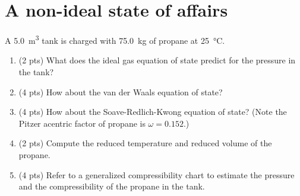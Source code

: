 \documentclass[11pt]{article}
\begin{document}
\section{A non-ideal state of affairs}
\label{sec-5}
A \SI{5.0}{\meter\cubed} tank is charged with \SI{75.0}{\kilo\gram} of propane at \SI{25}{\celsius}.

\begin{enumerate}
\item (2 pts) What does the ideal gas equation of state predict for the pressure in the tank?
\item (4 pts) How about the van der Waals equation of state?
\item (4 pts) How about the Soave-Redlich-Kwong equation of state?  (Note the Pitzer acentric factor of propane is \(\omega = 0.152\).)
\item (2 pts) Compute the reduced temperature and reduced volume of the propane.
\item (4 pts) Refer to a generalized compressibility chart to estimate the pressure and the compressibility of the propane in the tank.
\end{enumerate}
\end{document}
